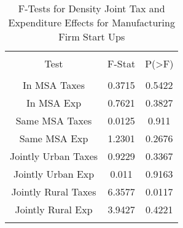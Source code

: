 
\begin{table}[!htbp] \centering 
  \caption{F-Tests for Density Joint Tax and Expenditure Effects for Manufacturing Firm Start Ups} 
  \label{31-33Ftests} 
\begin{tabular}{@{\extracolsep{5pt}} ccc} 
\\[-1.8ex]\hline 
\hline \\[-1.8ex] 
Test & F-Stat & P(\textgreater F) \\ 
\hline \\[-1.8ex] 
In MSA Taxes & 0.3715 & 0.5422 \\ 
In MSA Exp & 0.7621 & 0.3827 \\ 
Same MSA Taxes & 0.0125 & 0.911 \\ 
Same MSA Exp & 1.2301 & 0.2676 \\ 
Jointly Urban Taxes & 0.9229 & 0.3367 \\ 
Jointly Urban Exp & 0.011 & 0.9163 \\ 
Jointly Rural Taxes & 6.3577 & 0.0117 \\ 
Jointly Rural Exp & 3.9427 & 0.4221 \\ 
\hline \\[-1.8ex] 
\end{tabular} 
\end{table} 
